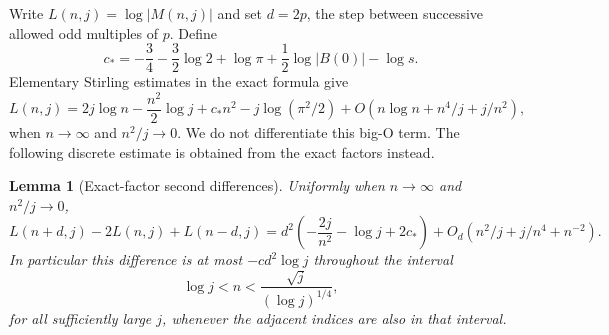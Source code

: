 \documentclass[11pt]{article}
\numberwithin{equation}{section}
\newtheorem{lemma}[theorem]{Lemma}
\theoremstyle{definition}
\begin{document}
Write $L(n,j)=\log|M(n,j)|$ and set $d=2p$, the step between
successive allowed odd multiples of $p$. Define
\begin{equation}\label{eq:jets_c0}
 c_*=-\frac34-\frac32\log2+\log\pi
       +\frac12\log|B(0)|-\log s.
\end{equation}
Elementary Stirling estimates in the exact formula give
\begin{equation}\label{eq:jets_L_expansion}
 L(n,j)=2j\log n-\frac{n^2}2\log j+c_*n^2
       -j\log(\pi^2/2)
       +O(n\log n+n^4/j+j/n^2),
\end{equation}
when $n\to\infty$ and $n^2/j\to0$.
We do not differentiate this big-O term. The following discrete
estimate is obtained from the exact factors instead.

\begin{lemma}[Exact-factor second differences]
\label{lem:jets_discrete_concavity}
Uniformly when $n\to\infty$ and $n^2/j\to0$,
\begin{equation}\label{eq:jets_second_difference}
 L(n+d,j)-2L(n,j)+L(n-d,j)
 =d^2\left(-\frac{2j}{n^2}-\log j+2c_*\right)
  +O_d(n^2/j+j/n^4+n^{-2}).
\end{equation}
In particular this difference is at most $-c d^2\log j$ throughout
the interval
\begin{equation}\label{eq:jets_middle_window}
 \log j<n<\frac{\sqrt j}{(\log j)^{1/4}},
\end{equation}
for all sufficiently large $j$, whenever the adjacent indices are
also in that interval.
\end{lemma}
\end{document}
